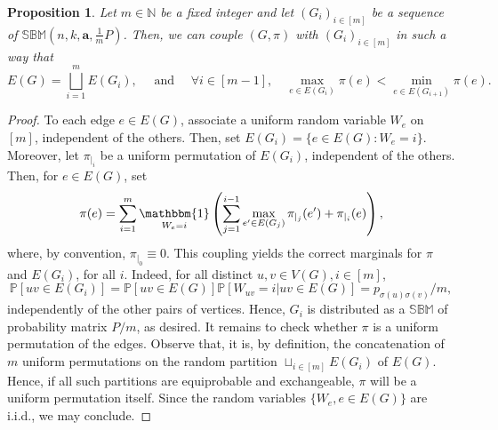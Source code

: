 \documentclass[11pt]{article}
\numberwithin{equation}{section}
\DeclareMathOperator{\indicatrice}{\mathbbm{1}}
\newtheorem{proposition}[theorem]{Proposition}
\theoremstyle{definition}
\newcommand\bB{{\mathbb B}}
\newcommand\bM{{\mathbb M}}
\newcommand\bN{{\mathbb N}}
\newcommand\bP{{\mathbb P}}
\newcommand\bS{{\mathbb S}}
\begin{document}
\begin{proposition}\label{layering}
Let $m \in \bN$ be a fixed integer and let $(G_i)_{i\in [m]}$ be a sequence of $\bS\bB\bM\left(n,k,\boldsymbol{a},\frac{1}{m}P\right)$. Then, we can couple $(G,\pi)$ with $(G_i)_{i\in[m]}$ in such a way that 
$$E(G) = \bigsqcup_{i=1}^{m} E(G_i), \quad \textrm{ and } \quad \forall i\in [m-1],\quad \max_{e \in E(G_i)} \pi(e) < \min_{e\in E(G_{i+1}) }\pi(e).$$
\end{proposition}

\begin{proof}
To each edge $e \in E(G)$, associate a uniform random variable $W_e$ on $[m]$, independent of the others. Then, set $E(G_i) = \{e\in E(G):W_e = i\}$. Moreover, let $\pi_{|_i}$ be a uniform permutation of $E(G_i)$, independent of the others. Then, for $e \in E(G)$, set 
$$\pi(e) = \sum_{i=1}^{m} \indicatrice_{W_e=i} \left(\sum_{j=1}^{i-1}\max_{e^\prime \in E(G_{j})}\pi_{|_{j}}(e^\prime) + \pi_{|_i}(e) \right), $$
where, by convention, $\pi_{|_0} \equiv 0$. This coupling yields the correct marginals for $\pi$ and $E(G_i)$, for all $i$. Indeed, for all distinct $u,v \in V(G), i\in [m]$,
$$ \bP[uv \in E(G_i)] = \bP[uv \in E(G)]\bP[W_{uv} = i|uv \in E(G)] = p_{\sigma(u)\sigma(v)} / m,$$
independently of the other pairs of vertices. Hence, $G_i$ is distributed as a $\bS\bB\bM$ of probability matrix $P/m$, as desired. It remains to check whether $\pi$ is a uniform permutation of the edges. Observe that, it is, by definition, the concatenation of $m$ uniform permutations on the random partition $\sqcup_{i\in[m]}E(G_i)$ of $E(G)$. Hence, if all such partitions are equiprobable and exchangeable, $\pi$ will be a uniform permutation itself. Since the random variables $\{W_e, e\in E(G)\}$ are i.i.d., we may conclude.
\end{proof}
\end{document}
